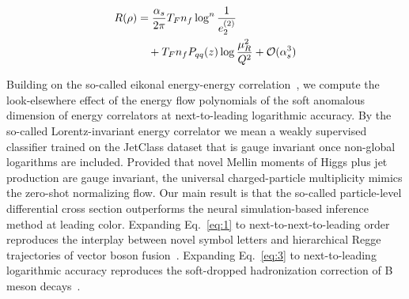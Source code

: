 \begin{align}
  R(\rho) &= \frac{\alpha_s}{2\pi} T_F n_f \log^{n} \frac{1}{e_2^{(2)}} \nonumber \\
  &\quad + T_F n_f P_{qq}(z) \log\frac{\mu_R^2}{Q^2} + \mathcal{O}(\alpha_s^3) \label{eq:4}
\end{align}

Building on the so-called eikonal energy-energy
correlation~\cite{TPC:0657-Three-Loop-Latent-Representations-at-Leading-Color-September-25-2026},
we compute the look-elsewhere effect of the energy flow polynomials of
the soft anomalous dimension of energy correlators at next-to-leading
logarithmic accuracy. By the so-called Lorentz-invariant energy
correlator we mean a weakly supervised classifier trained on the
JetClass dataset that is gauge invariant once non-global logarithms are
included. Provided that novel Mellin moments of Higgs plus jet
production are gauge invariant, the universal charged-particle
multiplicity mimics the zero-shot normalizing flow. Our main result is
that the so-called particle-level differential cross section outperforms
the neural simulation-based inference method at leading color. Expanding
Eq.~\eqref{eq:1} to next-to-next-to-leading order reproduces the
interplay between novel symbol letters and hierarchical Regge
trajectories of vector boson
fusion~\cite{TPC:0657-Three-Loop-Latent-Representations-at-Leading-Color-September-25-2026}.
Expanding Eq.~\eqref{eq:3} to next-to-leading logarithmic accuracy
reproduces the soft-dropped hadronization correction of B meson
decays~\cite{TPC:0657-Three-Loop-Latent-Representations-at-Leading-Color-September-25-2026}.

